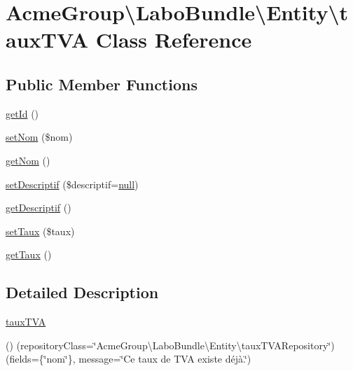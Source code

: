 \hypertarget{class_acme_group_1_1_labo_bundle_1_1_entity_1_1taux_t_v_a}{\section{Acme\+Group\textbackslash{}Labo\+Bundle\textbackslash{}Entity\textbackslash{}taux\+T\+V\+A Class Reference}
\label{class_acme_group_1_1_labo_bundle_1_1_entity_1_1taux_t_v_a}
}
\subsection*{Public Member Functions}
\begin{DoxyCompactItemize}
\item 
\hyperlink{class_acme_group_1_1_labo_bundle_1_1_entity_1_1taux_t_v_a_aeb037b84ea3f12b5aa12dfc055d07947}{get\+Id} ()
\item 
\hyperlink{class_acme_group_1_1_labo_bundle_1_1_entity_1_1taux_t_v_a_aa91e3e4af239e9c225ee7b7bc44aa97a}{set\+Nom} (\$nom)
\item 
\hyperlink{class_acme_group_1_1_labo_bundle_1_1_entity_1_1taux_t_v_a_ae1460be760344a2a228386c5e9351247}{get\+Nom} ()
\item 
\hyperlink{class_acme_group_1_1_labo_bundle_1_1_entity_1_1taux_t_v_a_a20a00e07ae3b7d36c07ab7f69f6b65ee}{set\+Descriptif} (\$descriptif=\hyperlink{validate_8js_afb8e110345c45e74478894341ab6b28e}{null})
\item 
\hyperlink{class_acme_group_1_1_labo_bundle_1_1_entity_1_1taux_t_v_a_a9c79393fb7eaa2ce93a893b382361c16}{get\+Descriptif} ()
\item 
\hyperlink{class_acme_group_1_1_labo_bundle_1_1_entity_1_1taux_t_v_a_a4027990afd80ef0960db9cdb9198e424}{set\+Taux} (\$taux)
\item 
\hyperlink{class_acme_group_1_1_labo_bundle_1_1_entity_1_1taux_t_v_a_a916a526014dbed37ac89b2e4fa01cdb6}{get\+Taux} ()
\end{DoxyCompactItemize}


\subsection{Detailed Description}
\hyperlink{class_acme_group_1_1_labo_bundle_1_1_entity_1_1taux_t_v_a}{taux\+T\+V\+A}

() (repository\+Class=\char`\"{}\+Acme\+Group\textbackslash{}\+Labo\+Bundle\textbackslash{}\+Entity\textbackslash{}taux\+T\+V\+A\+Repository\char`\"{}) (fields=\{\char`\"{}nom\char`\"{}\}, message=\char`\"{}\+Ce taux de T\+V\+A existe déjà.\char`\"{}) 

